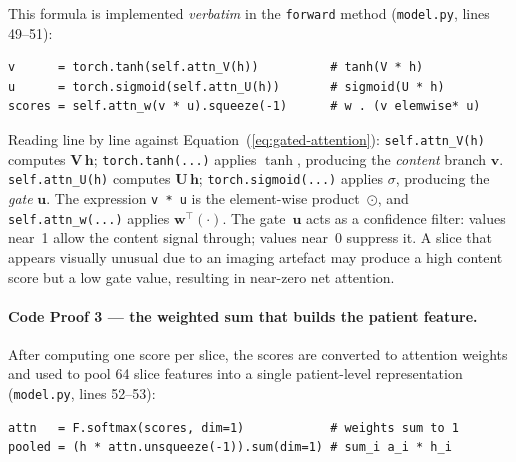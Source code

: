 This formula is implemented \emph{verbatim} in the
\texttt{forward} method
(\texttt{model.py}, lines 49--51):

\begin{verbatim}
v      = torch.tanh(self.attn_V(h))          # tanh(V * h)
u      = torch.sigmoid(self.attn_U(h))       # sigmoid(U * h)
scores = self.attn_w(v * u).squeeze(-1)      # w . (v elemwise* u)
\end{verbatim}

Reading line by line against Equation~(\ref{eq:gated-attention}):
\texttt{self.attn\_V(h)} computes $\mathbf{V}\,\mathbf{h}$;
\texttt{torch.tanh(...)} applies $\tanh$, producing the
\emph{content} branch $\mathbf{v}$.
\texttt{self.attn\_U(h)} computes $\mathbf{U}\,\mathbf{h}$;
\texttt{torch.sigmoid(...)} applies $\sigma$, producing
the \emph{gate} $\mathbf{u}$.
The expression \texttt{v~*~u} is the
element-wise product~$\odot$, and
\texttt{self.attn\_w(...)} applies
$\mathbf{w}^\top(\cdot)$.
The gate~$\mathbf{u}$ acts as a confidence filter:
values near~1 allow the content signal through;
values near~0 suppress it.
A slice that appears visually unusual due to an imaging
artefact may produce a high content score but a low
gate value, resulting in near-zero net attention.


\paragraph{Code Proof 3 — the weighted sum that builds the patient feature.}

After computing one score per slice, the scores are
converted to attention weights and used to pool 64
slice features into a single patient-level representation
(\texttt{model.py}, lines 52--53):

\begin{verbatim}
attn   = F.softmax(scores, dim=1)            # weights sum to 1
pooled = (h * attn.unsqueeze(-1)).sum(dim=1) # sum_i a_i * h_i
\end{verbatim}

